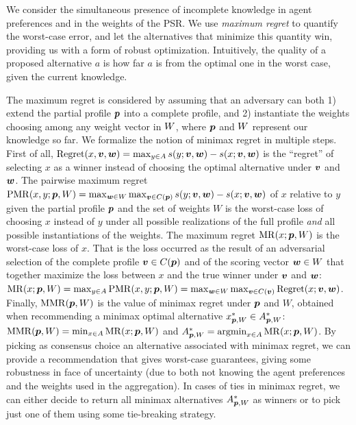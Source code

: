 \documentclass{article}
\begin{document}
We consider the simultaneous presence of incomplete knowledge in agent preferences and in the weights of the PSR.
We use \emph{maximum regret} to quantify the worst-case error, and let the alternatives that minimize this quantity win, providing us with a form of robust optimization.
Intuitively, the quality of a proposed alternative $a$ is how far $a$ is from the optimal one in the worst case, given the current knowledge.

The maximum regret is considered by assuming that an adversary can both 1) extend the partial profile ${\bm{p}}$ into a complete profile, and 2) instantiate the weights choosing among any weight vector in $W$, where ${\bm{p}}$ and $W$ represent our knowledge so far.
We formalize the notion of minimax regret in multiple steps.
First of all, $\operatorname{Regret}(x, \bm{v}, \bm{w}) = \max_{y \in A} s(y; \bm{v},\bm{w}) - s(x; \bm{v}, \bm{w})$ is the “regret” of selecting $x$ as a winner instead of choosing the optimal alternative under $\bm{v}$ and $\bm{w}$.
The pairwise maximum regret $\operatorname{PMR}(x,y;{\bm{p}},W) = \max_{\bm{w} \in W} \max_{\bm{v} \in C({\bm{p}})} s(y; \bm{v},\bm{w}) - s(x; \bm{v},\bm{w})$ of $x$ relative to $y$ given the partial profile ${\bm{p}}$ and the set of weights $W$
is the worst-case loss of choosing $x$ instead of $y$ under all possible realizations of the full profile {\em and} all possible instantiations of the weights.
The maximum regret $\operatorname{MR}(x;{\bm{p}},W)$ is the worst-case loss of $x$. That is the loss occurred as the result of an adversarial selection of the complete profile $\bm{v} \in C({\bm{p}})$ and of the scoring vector $\bm{w} \in W$ that together maximize the loss between $x$ and the true winner under $\bm{v}$ and $\bm{w}$: $\operatorname{MR}(x; {\bm{p}}, W) = \max_{y \in A} \operatorname{PMR}(x,y; {\bm{p}}, W) = \max_{\bm{w} \in W} \max_{\bm{v} \in C(\bm{v})} \operatorname{Regret}(x; \bm{v}, \bm{w})$.
Finally,  $\operatorname{MMR}({\bm{p}},W)$ is the value of minimax regret under ${\bm{p}}$ and $W$, obtained when recommending a minimax optimal alternative $x^*_{{\bm{p}}, W} \in A^*_{{\bm{p}}, W}$: $\operatorname{MMR}({\bm{p}},W) = \min_{x \in A} \operatorname{MR}(x;{\bm{p}},W)$ and $A^*_{{\bm{p}}, W} = \operatorname*{argmin}_{x \in A} \operatorname{MR}(x;{\bm{p}},W)$.
By picking as consensus choice
an alternative associated with minimax regret, we can provide a recommendation that gives worst-case guarantees, giving some robustness in face of uncertainty (due to both not knowing the agent preferences and the weights used in the aggregation). 
In cases of ties in minimax regret, we can either decide to return all minimax alternatives $A^*_{{\bm{p}}, W}$ as winners or to pick just one of them using some tie-breaking strategy.
\end{document}
